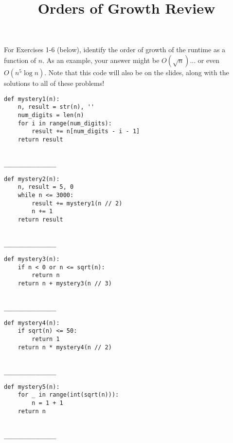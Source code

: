 \documentclass[twoside]{article}
\title{\sc Orders of Growth Review}
\begin{document}
\thispagestyle{empty}
\maketitle

For Exercises 1-6 (below), identify the order of growth of the runtime as a function of $n$. As an example, your answer might be $O(\sqrt{n})$... or even $O(n^5\log{n})$. Note that this code will also be on the slides, along with the solutions to all of these problems!

\begin{enumerate}


\begin{lstlisting}
def mystery1(n):
    n, result = str(n), ''
    num_digits = len(n)
    for i in range(num_digits):
        result += n[num_digits - i - 1]
    return result
\end{lstlisting}
~\\
\lstinline{_______________}

\begin{lstlisting}
def mystery2(n):
    n, result = 5, 0
    while n <= 3000:
        result += mystery1(n // 2)
        n += 1
    return result
\end{lstlisting}
~\\
\lstinline{_______________}


\begin{lstlisting}
def mystery3(n):
    if n < 0 or n <= sqrt(n):
        return n
    return n + mystery3(n // 3)
\end{lstlisting}
~\\
\lstinline{_______________}

\begin{lstlisting}
def mystery4(n):
    if sqrt(n) <= 50:
        return 1
    return n * mystery4(n // 2)
\end{lstlisting}
~\\
\lstinline{_______________}

\begin{lstlisting}
def mystery5(n):
    for _ in range(int(sqrt(n))):
        n = 1 + 1
    return n
\end{lstlisting}
~\\
\lstinline{_______________}



\end{enumerate}
\end{document}

